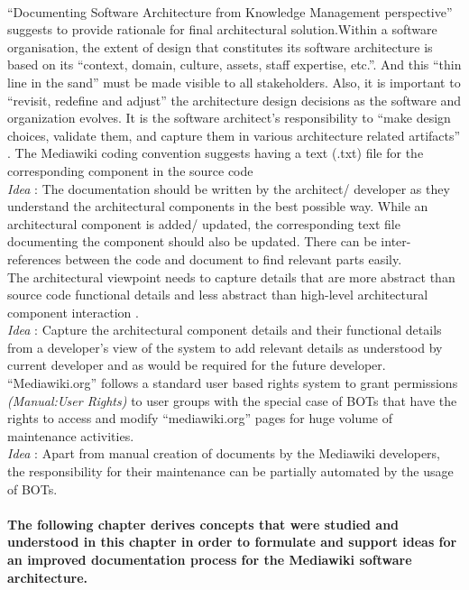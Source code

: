 \\\indent \enquote{Documenting Software Architecture from Knowledge Management perspective} \cite{bab2009} suggests to provide rationale for final architectural solution.Within a software organisation, the extent of design that constitutes its software architecture is based on its \enquote{context, domain, culture, assets, staff expertise, etc.}. And this \enquote{thin line in the sand} must be made visible to all stakeholders. Also, it is important to \enquote{revisit, redefine and adjust} the architecture design decisions as the software and organization evolves. It is the software architect's responsibility to \enquote{make design choices, validate them, and capture them in various architecture related artifacts} \cite{Kruchten2008}. The Mediawiki coding convention suggests having a text (.txt) file for the corresponding component in the source code \cite{Manual_coding}
\\\indent \emph{Idea} : The documentation should be written by the architect/ developer as they understand the architectural components in the best possible way. While an architectural component is added/ updated, the corresponding text file documenting the component should also be updated. There can be inter-references between the code and document to find relevant parts easily.
\newline
\\\indent The architectural viewpoint needs to capture details that are more abstract than source code functional details and less abstract than high-level architectural component interaction \cite{bab2009}. 
\\\indent \emph{Idea} : Capture the architectural component details and their functional details from a developer's view of the system to add relevant details as understood by current developer and as would be required for the future developer.
\newline
\\\indent \enquote{Mediawiki.org} follows a standard user based rights system to grant permissions \emph{(Manual:User Rights)} to user groups with the special case of BOTs that have the rights to access and modify \enquote{mediawiki.org} pages for huge volume of maintenance activities.
\\\indent \emph{Idea} : Apart from manual creation of documents by the Mediawiki developers, the responsibility for their maintenance can be partially automated by the usage of BOTs.



\paragraph{The following chapter derives concepts that were studied and understood in this chapter in order to formulate and support ideas for an improved documentation process for the Mediawiki software architecture. }

